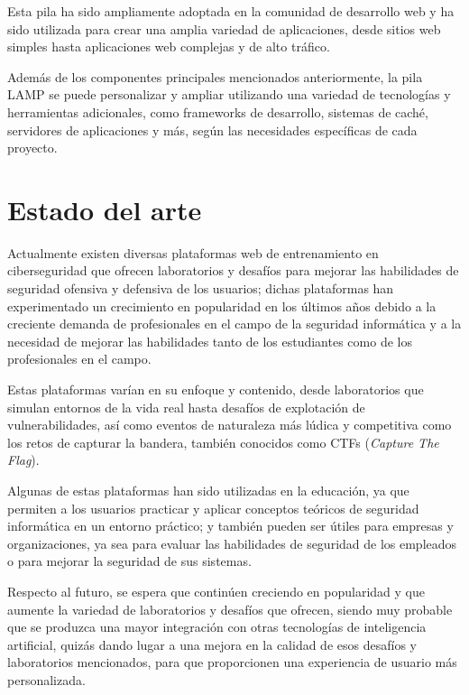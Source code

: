             Esta pila ha sido ampliamente adoptada en la comunidad de desarrollo web y ha sido utilizada para crear una amplia variedad de aplicaciones, desde sitios web simples hasta aplicaciones web complejas y de alto tráfico.

            Además de los componentes principales mencionados anteriormente, la pila LAMP se puede personalizar y ampliar utilizando una variedad de tecnologías y herramientas adicionales, como frameworks de desarrollo, sistemas de caché, servidores de aplicaciones y más, según las necesidades específicas de cada proyecto.

            \cleardoublepage

    
     
\chapter{Estado del arte}
    \label{cap:estado-arte}

    Actualmente existen diversas plataformas web de entrenamiento en ciberseguridad que ofrecen laboratorios y desafíos para mejorar las habilidades de seguridad ofensiva y defensiva de los usuarios; dichas plataformas han experimentado un crecimiento en popularidad en los últimos años debido a la creciente demanda de profesionales en el campo de la seguridad informática y a la necesidad de mejorar las habilidades tanto de los estudiantes como de los profesionales en el campo.
    
    Estas plataformas varían en su enfoque y contenido, desde laboratorios que simulan entornos de la vida real hasta desafíos de explotación de vulnerabilidades, así como eventos de naturaleza más lúdica y competitiva como los retos de capturar la bandera, también conocidos como CTFs (\textit{Capture The Flag}).
    
    Algunas de estas plataformas han sido utilizadas en la educación, ya que permiten a los usuarios practicar y aplicar conceptos teóricos de seguridad informática en un entorno práctico; y también pueden ser útiles para empresas y organizaciones, ya sea para evaluar las habilidades de seguridad de los empleados o para mejorar la seguridad de sus sistemas.
    
    Respecto al futuro, se espera que continúen creciendo en popularidad y que aumente la variedad de laboratorios y desafíos que ofrecen, siendo muy probable que se produzca una mayor integración con otras tecnologías de inteligencia artificial, quizás dando lugar a una mejora en la calidad de esos desafíos y laboratorios mencionados, para que proporcionen una experiencia de usuario más personalizada.
    
